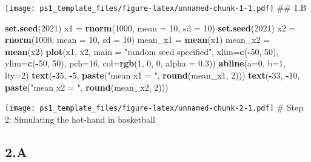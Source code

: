 \documentclass[
]{article}
\newenvironment{Shaded}{\begin{snugshade}}{\end{snugshade}}
\newcommand{\AttributeTok}[1]{\textcolor[rgb]{0.13,0.29,0.53}{#1}}
\newcommand{\DecValTok}[1]{\textcolor[rgb]{0.00,0.00,0.81}{#1}}
\newcommand{\FloatTok}[1]{\textcolor[rgb]{0.00,0.00,0.81}{#1}}
\newcommand{\FunctionTok}[1]{\textcolor[rgb]{0.13,0.29,0.53}{\textbf{#1}}}
\newcommand{\NormalTok}[1]{#1}
\newcommand{\OtherTok}[1]{\textcolor[rgb]{0.56,0.35,0.01}{#1}}
\newcommand{\SpecialCharTok}[1]{\textcolor[rgb]{0.81,0.36,0.00}{\textbf{#1}}}
\newcommand{\StringTok}[1]{\textcolor[rgb]{0.31,0.60,0.02}{#1}}
\begin{document}
\texttt{[image: ps1\_template\_files/figure-latex/unnamed-chunk-1-1.pdf]}
\#\# 1.B

\begin{Shaded}
\begin{Highlighting}[]
\FunctionTok{set.seed}\NormalTok{(}\DecValTok{2021}\NormalTok{)}
\NormalTok{x1 }\OtherTok{=} \FunctionTok{rnorm}\NormalTok{(}\DecValTok{1000}\NormalTok{, }\AttributeTok{mean =} \DecValTok{10}\NormalTok{, }\AttributeTok{sd =} \DecValTok{10}\NormalTok{)}
\FunctionTok{set.seed}\NormalTok{(}\DecValTok{2021}\NormalTok{)}
\NormalTok{x2 }\OtherTok{=} \FunctionTok{rnorm}\NormalTok{(}\DecValTok{1000}\NormalTok{, }\AttributeTok{mean =} \DecValTok{10}\NormalTok{, }\AttributeTok{sd =} \DecValTok{10}\NormalTok{)}
\NormalTok{mean\_x1 }\OtherTok{=} \FunctionTok{mean}\NormalTok{(x1)}
\NormalTok{mean\_x2 }\OtherTok{=} \FunctionTok{mean}\NormalTok{(x2)}
\FunctionTok{plot}\NormalTok{(x1, x2, }\AttributeTok{main =} \StringTok{"random seed specified"}\NormalTok{, }\AttributeTok{xlim=}\FunctionTok{c}\NormalTok{(}\SpecialCharTok{{-}}\DecValTok{50}\NormalTok{, }\DecValTok{50}\NormalTok{), }
     \AttributeTok{ylim=}\FunctionTok{c}\NormalTok{(}\SpecialCharTok{{-}}\DecValTok{50}\NormalTok{, }\DecValTok{50}\NormalTok{), }\AttributeTok{pch=}\DecValTok{16}\NormalTok{, }\AttributeTok{col=}\FunctionTok{rgb}\NormalTok{(}\DecValTok{1}\NormalTok{, }\DecValTok{0}\NormalTok{, }\DecValTok{0}\NormalTok{, }\AttributeTok{alpha =} \FloatTok{0.3}\NormalTok{))}
\FunctionTok{abline}\NormalTok{(}\AttributeTok{a=}\DecValTok{0}\NormalTok{, }\AttributeTok{b=}\DecValTok{1}\NormalTok{, }\AttributeTok{lty=}\DecValTok{2}\NormalTok{)}
\FunctionTok{text}\NormalTok{(}\SpecialCharTok{{-}}\DecValTok{35}\NormalTok{, }\SpecialCharTok{{-}}\DecValTok{5}\NormalTok{, }\FunctionTok{paste}\NormalTok{(}\StringTok{"mean x1 = "}\NormalTok{, }\FunctionTok{round}\NormalTok{(mean\_x1, }\DecValTok{2}\NormalTok{)))}
\FunctionTok{text}\NormalTok{(}\SpecialCharTok{{-}}\DecValTok{33}\NormalTok{, }\SpecialCharTok{{-}}\DecValTok{10}\NormalTok{, }\FunctionTok{paste}\NormalTok{(}\StringTok{"mean x2 = "}\NormalTok{, }\FunctionTok{round}\NormalTok{(mean\_x2, }\DecValTok{2}\NormalTok{)))}
\end{Highlighting}
\end{Shaded}

\texttt{[image: ps1\_template\_files/figure-latex/unnamed-chunk-2-1.pdf]}
\# Step 2: Simulating the hot-hand in basketball

\hypertarget{a-1}{%
\subsection{2.A}\label{a-1}}
\end{document}
